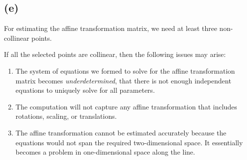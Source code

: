 \documentclass{article}
\begin{document}
\subsection*{(e)}
For estimating the affine transformation matrix, we need at least three non-collinear points. 

\vspace{5pt}
If all the selected points are collinear, then the following issues may arise:
\begin{enumerate}
\item The system of equations we formed to solve for the affine transformation matrix becomes \textit{underdetermined}, that there is not enough independent equations to uniquely solve for all parameters.
\item The computation will not capture any affine transformation that includes rotations, scaling, or translations.
\item The affine transformation cannot be estimated accurately because the equations would not span the required two-dimensional space. It essentially becomes a problem in one-dimensional space along the line.
\end{enumerate} 
\end{document}
